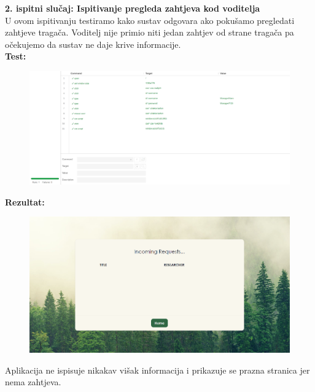 \noindent \textbf{2. ispitni slučaj: Ispitivanje pregleda zahtjeva kod voditelja}\\
U ovom ispitivanju testiramo kako sustav odgovara ako pokušamo pregledati zahtjeve tragača. Voditelj nije primio niti jedan zahtjev od strane tragača pa očekujemo da sustav ne daje krive informacije. \\
\textbf{Test:}
\begin{figure}[H]
	\includegraphics[scale=0.4]{slike/test2sel.PNG} %
	\centering
\end{figure}
\noindent \textbf{Rezultat:}
\begin{figure}[H]
	\includegraphics[scale=0.5]{slike/test2selrez.PNG} %
	\centering
\end{figure}
\noindent Aplikacija ne ispisuje nikakav višak informacija i prikazuje se prazna stranica jer nema zahtjeva. \\

